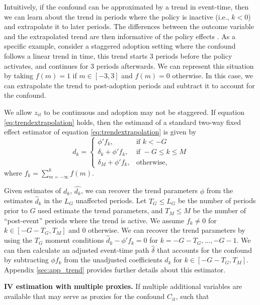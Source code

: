\documentclass[bib]{./sty/statapress}
\begin{document}
Intuitively, if the confound can be approximated by a trend in event-time, then we can learn about the trend in periods where the policy is inactive (i.e., $k<0$) and extrapolate it to later periods.
The differences between the outcome variable and the extrapolated trend are then informative of the policy effects \citep{dobkin2018economic}.
As a specific example, consider a staggered adoption setting where the confound follows a linear trend in time, this trend starts 3 periods before the policy activates, and continues for 3 periods afterwards.
We can represent this situation by taking $f(m) = 1$ if $m \in \left[-3,3\right]$ and $f(m)=0$ otherwise. In this case, we can extrapolate the trend to post-adoption periods and subtract it to account for the confound.

We allow $z_{it}$ to be continuous and adoption may not be staggered.
If equation \eqref{eq:trendextrapolation} holds, then the estimand of a standard two-way fixed effect estimator of equation \eqref{eq:trendextrapolation} is given by
\begin{equation}\label{eq:trendcases}
  d_k =
  \begin{cases}
    \phi' f_k, & \mbox{if } k < -G \\
    \delta_k + \phi' f_k, & \mbox{if } -G \leq k \leq M \\
    \delta_M + \phi'f_k, & \mbox{otherwise},
  \end{cases}
\end{equation}
where $f_k = \sum_{m = -\infty}^{k} f(m)$.

Given estimates of $d_k$, $\hat{d_k}$, we can recover the trend parameters $\phi$ from the estimates $\hat{d}_k$ in the $L_G$ unaffected periods.
Let $T_G \leq L_G$ be the number of periods prior to $G$ used estimate the trend parameters, and $T_M \leq M$ be the number of ``post-event'' periods where the trend is active.
We assume $f_k \neq 0$ for $k \in \left[-G-T_G,T_M \right]$ and $0$ otherwise.
We can recover the trend parameters by using the $T_G$ moment conditions $\hat{d}_k - \phi' f_k = 0$ for $k = -G - T_G,\ldots,-G-1$.
We can then calculate an adjusted event-time path $\hat{\delta}$ that accounts for the confound by subtracting $\phi f_k$ from the unadjusted coefficients $d_k$ for $k \in \left[-G-T_G,T_M\right]$.
Appendix \ref{sec:app_trend} provides further details about this estimator.

\noindent \textbf{IV estimation with multiple proxies.}
If multiple additional variables are available that may serve as proxies for the confound $C_{it}$, such that
\end{document}
